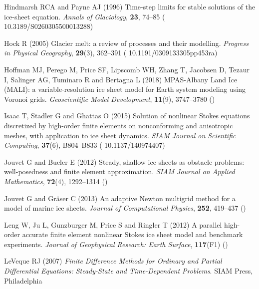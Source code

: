 \documentclass[review]{igs}
\begin{document}
\begin{thebibliography}{34}
Hindmarsh RCA and Payne AJ (1996) Time-step limits for stable solutions of the
  ice-sheet equation. \emph{Annals of Glaciology}, \textbf{23}, 74--85 (\doi
  {10.3189/S0260305500013288})

Hock R (2005) Glacier melt: a review of processes and their modelling.
  \emph{Progress in Physical Geography}, \textbf{29}(3), 362--391 (\doi
  {10.1191/0309133305pp453ra})

Hoffman MJ, Perego M, Price SF, Lipscomb WH, Zhang T, Jacobsen D, Tezaur I,
  Salinger AG, Tuminaro R and Bertagna L (2018) {MPAS-Albany Land Ice (MALI)}:
  a variable-resolution ice sheet model for {E}arth system modeling using
  {V}oronoi grids. \emph{Geoscientific Model Development}, \textbf{11}(9),
  3747--3780 ()

Isaac T, Stadler G and Ghattas O (2015) Solution of nonlinear {S}tokes
  equations discretized by high-order finite elements on nonconforming and
  anisotropic meshes, with application to ice sheet dynamics. \emph{SIAM
  Journal on Scientific Computing}, \textbf{37}(6), B804--B833 (\doi
  {10.1137/140974407})

Jouvet G and Bueler E (2012) Steady, shallow ice sheets as obstacle problems:
  well-posedness and finite element approximation. \emph{SIAM Journal on
  Applied Mathematics}, \textbf{72}(4), 1292--1314 ()

Jouvet G and Gr{\"a}ser C (2013) An adaptive {N}ewton multigrid method for a
  model of marine ice sheets. \emph{Journal of Computational Physics},
  \textbf{252}, 419--437 ()

Leng W, Ju L, Gunzburger M, Price S and Ringler T (2012) A parallel high-order
  accurate finite element nonlinear {S}tokes ice sheet model and benchmark
  experiments. \emph{Journal of Geophysical Research: Earth Surface},
  \textbf{117}(F1) ()

LeVeque RJ (2007) \emph{{Finite Difference Methods for Ordinary and Partial
  Differential Equations: Steady-State and Time-Dependent Problems}}. SIAM
  Press, Philadelphia


\end{thebibliography}
\end{document}
